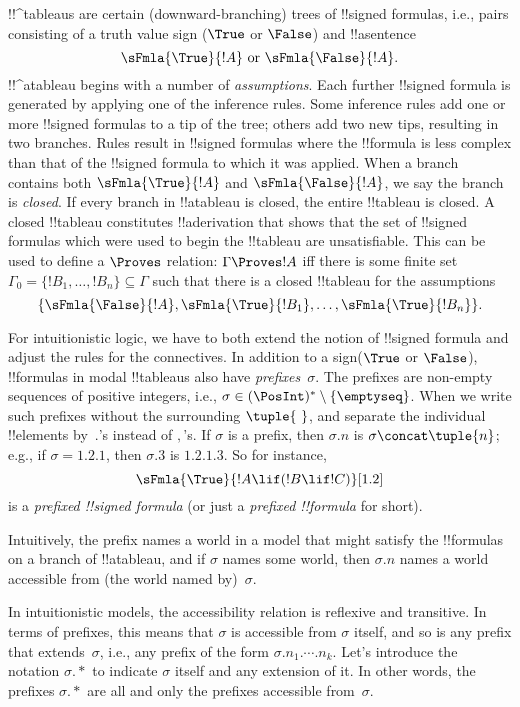 \documentclass[../../../include/open-logic-section]{subfiles}
\begin{document}


!!^{tableau}s are certain (downward-branching) trees of !!{signed
  formula}s, i.e., pairs consisting of a truth value sign ($\True$ or
$\False$) and !!a{sentence}
\[
\sFmla{\True}{!A} \text{ or } \sFmla{\False}{!A}.
\]
!!^a{tableau} begins with a number of \emph{assumptions}. Each further
!!{signed formula} is generated by applying one of the inference
rules. Some inference rules add one or more !!{signed formula}s to a
tip of the tree; others add two new tips, resulting in two branches.
Rules result in !!{signed formula}s where the !!{formula} is
less complex than that of the !!{signed formula} to which it was
applied. When a branch contains both $\sFmla{\True}{!A}$ and
$\sFmla{\False}{!A}$, we say the branch is \emph{closed}. If every
branch in !!a{tableau} is closed, the entire !!{tableau} is closed. A
closed !!{tableau} constitutes !!a{derivation} that shows that the set
of !!{signed formula}s which were used to begin the !!{tableau} are
unsatisfiable.  This can be used to define a $\Proves$ relation:
$\Gamma \Proves !A$ iff there is some finite set~$\Gamma_0 = \{!B_1,
\dots, !B_n\} \subseteq \Gamma$ such that there is a closed
!!{tableau} for the assumptions
\[
\{\sFmla{\False}{!A}, \sFmla{\True}{!B_1}, \dots, \sFmla{\True}{!B_n}\}.
\]

For intuitionistic logic, we have to both extend the notion of
!!{signed formula} and adjust the rules for the connectives. In
addition to a sign($\True$ or $\False$), !!{formula}s in modal
!!{tableau}s also have \emph{prefixes}~$\sigma$. The prefixes are
non-empty sequences of positive integers, i.e., $\sigma \in
(\PosInt)^* \setminus \{\emptyseq\}$. When we write such prefixes
without the surrounding $\tuple{\ }$, and separate the individual
!!{element}s by~$.$'s instead of $,$'s. If $\sigma$ is a prefix, then
$\sigma.n$ is $\sigma \concat \tuple{n}$; e.g., if $\sigma = 1.2.1$,
then $\sigma.3$ is $1.2.1.3$. So for instance,
\[
\sFmla{\True}{!A \lif (!B \lif !C)}[1.2]
\]
is a \emph{prefixed !!{signed formula}} (or just a \emph{prefixed
  !!{formula}} for short).

Intuitively, the prefix names a world in a model that might satisfy
the !!{formula}s on a branch of !!a{tableau}, and if $\sigma$ names
some world, then $\sigma.n$ names a world accessible from (the world
named by)~$\sigma$.

In intuitionistic models, the accessibility relation is reflexive and
transitive. In terms of prefixes, this means that $\sigma$ is
accessible from $\sigma$ itself, and so is any prefix that
extends~$\sigma$, i.e., any prefix of the form
$\sigma.n_1.\cdots.n_k$. Let's introduce the notation $\sigma.*$ to
indicate $\sigma$ itself and any extension of it. In other words, the
prefixes $\sigma.*$ are all and only the prefixes accessible
from~$\sigma$.
\end{document}
